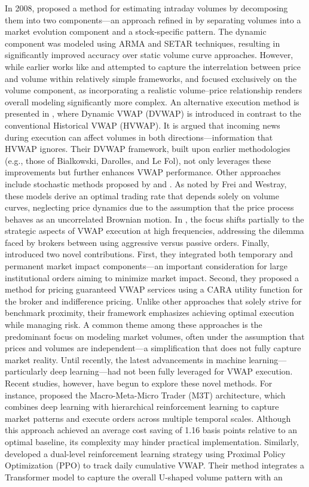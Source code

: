 In 2008, \cite{LeFol2006} proposed a method for estimating intraday volumes by decomposing them into two components—an approach refined in \cite{LeFol2012} by separating volumes into a market evolution component and a stock-specific pattern. The dynamic component was modeled using ARMA and SETAR techniques, resulting in significantly improved accuracy over static volume curve approaches. However, while earlier works like \cite{Konishi} and \cite{Culoch2007} attempted to capture the interrelation between price and volume within relatively simple frameworks, \cite{LeFol2006} and \cite{LeFol2012} focused exclusively on the volume component, as incorporating a realistic volume–price relationship renders overall modeling significantly more complex. An alternative execution method is presented in \cite{Humphery}, where Dynamic VWAP (DVWAP) is introduced in contrast to the conventional Historical VWAP (HVWAP). It is argued that incoming news during execution can affect volumes in both directions—information that HVWAP ignores. Their DVWAP framework, built upon earlier methodologies (e.g., those of Bialkowski, Darolles, and Le Fol), not only leverages these improvements but further enhances VWAP performance. Other approaches include stochastic methods proposed by \cite{bouchard} and \cite{frei}. As noted by Frei and Westray, these models derive an optimal trading rate that depends solely on volume curves, neglecting price dynamics due to the assumption that the price process behaves as an uncorrelated Brownian motion. In \cite{Tianhui}, the focus shifts partially to the strategic aspects of VWAP execution at high frequencies, addressing the dilemma faced by brokers between using aggressive versus passive orders. Finally, \cite{Gueant} introduced two novel contributions. First, they integrated both temporary and permanent market impact components—an important consideration for large institutional orders aiming to minimize market impact. Second, they proposed a method for pricing guaranteed VWAP services using a CARA utility function for the broker and indifference pricing. Unlike other approaches that solely strive for benchmark proximity, their framework emphasizes achieving optimal execution while managing risk. A common theme among these approaches is the predominant focus on modeling market volumes, often under the assumption that prices and volumes are independent—a simplification that does not fully capture market reality. Until recently, the latest advancements in machine learning—particularly deep learning—had not been fully leveraged for VWAP execution. Recent studies, however, have begun to explore these novel methods. For instance, \cite{li2022hierarchical} proposed the Macro-Meta-Micro Trader (M3T) architecture, which combines deep learning with hierarchical reinforcement learning to capture market patterns and execute orders across multiple temporal scales. Although this approach achieved an average cost saving of 1.16 basis points relative to an optimal baseline, its complexity may hinder practical implementation. Similarly, \cite{kim2023adaptive} developed a dual-level reinforcement learning strategy using Proximal Policy Optimization (PPO) to track daily cumulative VWAP. Their method integrates a Transformer model to capture the overall U-shaped volume pattern with an 
